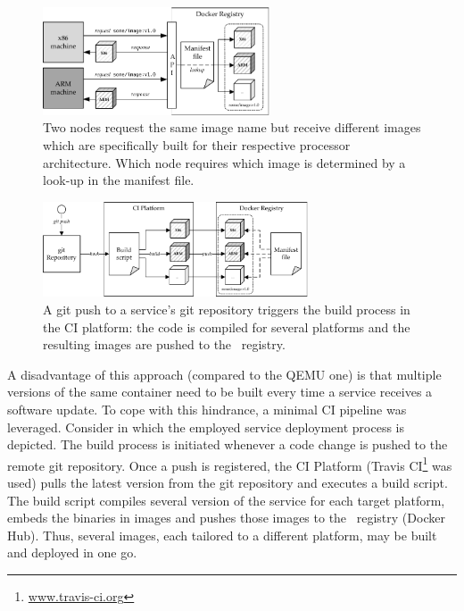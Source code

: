 \begin{figure}[htpb]
  \centering
  \includegraphics[width=0.6\textwidth]{figures/manifest-pull}
  \caption[Pulling \docker\ images via manifest file]{Two nodes request the same image name but receive different images which are specifically built for their respective processor architecture. Which node requires which image is determined by a look-up in the manifest file.}\label{fig:manifest-pull}
\end{figure}

\begin{figure}[htpb]
  \centering
  \includegraphics[width=0.7\textwidth]{figures/manifest-push}
  \caption[Pushing \docker\ images via CI]{A git push to a service's git repository triggers the build process in the CI platform: the code is compiled for several platforms and the resulting images are pushed to the \docker\ registry.}\label{fig:manifest-push}
\end{figure}

A disadvantage of this approach (compared to the QEMU one) is that multiple versions of the same container need to be built every time a service receives a software update. To cope with this hindrance, a minimal CI pipeline was leveraged. Consider  in which the employed service deployment process is depicted. The build process is initiated whenever a code change is pushed to the remote git repository. Once a push is registered, the CI Platform (Travis CI\footnote{\url{www.travis-ci.org}} was used) pulls the latest version from the git repository and executes a build script. The build script compiles several version of the service for each target platform, embeds the binaries in images and pushes those images to the \docker\ registry (Docker Hub). Thus, several images, each tailored to a different platform, may be built and deployed in one go.


